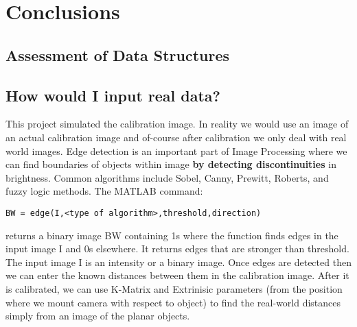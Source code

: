 \documentclass[titlepage]{article}
\begin{document}
\section{Conclusions}
\subsection{Assessment of Data Structures}
\subsection{How would I input real data?}
This project simulated the calibration image. In reality we would use an image of an actual calibration image and of-course after calibration we only deal with real world images. Edge detection is an important part of Image Processing where we can find boundaries of objects within image \textbf{by detecting discontinuities} in brightness. Common algorithms include Sobel, Canny, Prewitt, Roberts, and fuzzy logic methods. The MATLAB command:
\begin{verbatim}
BW = edge(I,<type of algorithm>,threshold,direction)
\end{verbatim}
returns a binary image BW containing 1s where the function finds edges in the input image I and 0s elsewhere. It returns edges that are stronger than threshold. The input image I is an intensity or a binary image. Once edges are detected then we can enter the known distances between them in the calibration image. After it is calibrated, we can use K-Matrix and Extrinisic parameters (from the position where we mount camera with respect to object) to find the real-world distances simply from an image of the planar objects. 
\end{document}
